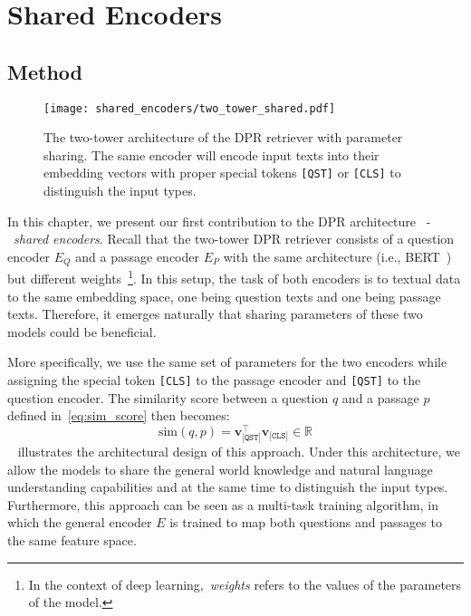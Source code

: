 
\chapter{Shared Encoders} %
\label{ch:shared_encoders}


\section{Method}\label{sec:shared_encoders_methods}


\begin{figure}[!htbp]
	\centering
	\texttt{[image: shared\_encoders/two\_tower\_shared.pdf]}
	\caption[Two-tower architecture of DPR retriever with parameter sharing.]{
		The two-tower architecture of the DPR retriever with parameter sharing.
		The same encoder will encode input texts into their embedding vectors with proper special tokens \texttt{[QST]} or \texttt{[CLS]} to distinguish the input types.
	}
	\label{fig:two_tower_shared}
\end{figure}


%
In this chapter, we present our first contribution to the DPR architecture~\cite{karpukhin2020dense} -~\emph{shared encoders}.
%
Recall that the two-tower DPR retriever consists of a question encoder $E_Q$ and a passage encoder $E_P$ with the same architecture (i.e., BERT~\cite{devlin2019bert}) but different weights~\footnote{In the context of deep learning,~\emph{weights} refers to the values of the parameters of the model.}.
%
In this setup, the task of both encoders is to textual data to the same embedding space, one being question texts and one being passage texts.
%
Therefore, it emerges naturally that sharing parameters of these two models could be beneficial.

%
More specifically, we use the same set of parameters for the two encoders while assigning the special token \texttt{[CLS]} to the passage encoder and \texttt{[QST]} to the question encoder.
%
The similarity score between a question $q$ and a passage $p$ defined in~\eqref{eq:sim_score} then becomes:
%
\begin{equation}
\text{sim}(q, p) = \mathbf{v}^\intercal_{\texttt{[QST]}} \mathbf{v}_{\texttt{[CLS]}} \in \mathbb{R}
\end{equation}
%
~ illustrates the architectural design of this approach.
%
Under this architecture, we allow the models to share the general world knowledge and natural language understanding capabilities and at the same time to distinguish the input types.
%
Furthermore, this approach can be seen as a multi-task training algorithm, in which the general encoder $E$ is trained to map both questions and passages to the same feature space.


